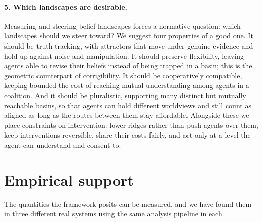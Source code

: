 \documentclass[11pt,a4paper]{article}
\begin{document}
\paragraph{5. Which landscapes are desirable.}
Measuring and steering belief landscapes forces a normative question: which
landscapes should we steer toward? We suggest four properties of a good one. It
should be truth-tracking, with attractors that move under genuine evidence and
hold up against noise and manipulation. It should preserve flexibility, leaving
agents able to revise their beliefs instead of being trapped in a basin; this
is the geometric counterpart of corrigibility. It should be cooperatively
compatible, keeping bounded the cost of reaching mutual understanding among
agents in a coalition. And it should be pluralistic, supporting many distinct
but mutually reachable basins, so that agents can hold different worldviews and
still count as aligned as long as the routes between them stay affordable.
Alongside these we place constraints on intervention: lower ridges rather than
push agents over them, keep interventions reversible, share their costs fairly,
and act only at a level the agent can understand and consent to.

\section{Empirical support}

The quantities the framework posits can be measured, and we have found them in
three different real systems using the same analysis pipeline in each.
\end{document}
